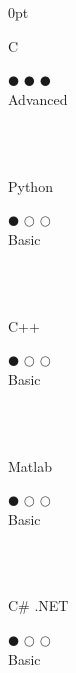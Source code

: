 \documentclass[a4paper]{article}
\begin{document}
\begin{adjustwidth}{\parindent}{0pt}
\begin{minipage}[t]{0.25\textwidth}
 \begin{minipage}{0.65\textwidth}
   \small{C}
 \end{minipage}
 \begin{minipage}{0.3\textwidth}
   \centering $\mdlgblkcircle$ $\mdlgblkcircle$ $\mdlgblkcircle$ \\  \footnotesize{Advanced}
 \end{minipage} \\ \hspace{0pt} \\
 
  \begin{minipage}{0.65\textwidth}
   \small{Python}
 \end{minipage}
 \begin{minipage}{0.3\textwidth}
   \centering $\mdlgblkcircle$ $\mdlgwhtcircle$ $\mdlgwhtcircle$ \\  \footnotesize{Basic}
 \end{minipage} \\ \hspace{0pt} \\
 
 \begin{minipage}{0.65\textwidth}
   \small{C++}
 \end{minipage}
 \begin{minipage}{0.3\textwidth}
   \centering $\mdlgblkcircle$ $\mdlgwhtcircle$ $\mdlgwhtcircle$ \\  \footnotesize{Basic}
 \end{minipage} \\ \hspace{0pt} \\
 
 \begin{minipage}{0.65\textwidth}
   \small{Matlab}
 \end{minipage}
 \begin{minipage}{0.3\textwidth}
   \centering $\mdlgblkcircle$ $\mdlgwhtcircle$ $\mdlgwhtcircle$ \\  \footnotesize{Basic}
 \end{minipage} \\ \hspace{0pt} \\
 
  \begin{minipage}{0.65\textwidth}
   \small{C\# .NET}
 \end{minipage}
 \begin{minipage}{0.3\textwidth}
   \centering $\mdlgblkcircle$ $\mdlgwhtcircle$ $\mdlgwhtcircle$ \\  \footnotesize{Basic}
 \end{minipage} \\ \hspace{0pt} \\


\end{minipage}
\end{adjustwidth}
\end{document}
